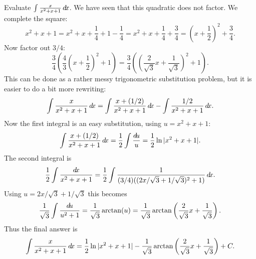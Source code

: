 \documentclass{ximera}
\begin{document}
\begin{example}
Evaluate $\int \frac{x}{x^2+x+1}\mathop{}\!d\! x$. We have seen that this
quadratic does not factor. We complete the square:
\[
  x^2+x+1=x^2+x+\frac{1}{4} + 1 -\frac{1}{4}=x^2+x+\frac{1}{4}+\frac{3}{4}=
  \left(x+\frac{1}{2}\right)^2+\frac{3}{4}.
\]
Now factor out $3/4$:
\[
  \frac{3}{4}\left(\frac{4}{3}\left(x+\frac{1}{2}\right)^2+1\right)
  =\frac{3}{4}\left(\left(\frac{2}{\sqrt{3}}x+\frac{1}{\sqrt3}\right)^2+1\right).
\]
This can be done as a rather messy trigonometric substitution problem,
but it is easier to do a bit more rewriting:
\[
  \int \frac{x}{x^2+x+1}\mathop{}\!d\! x=\int\frac{x+(1/2)}{x^2+x+1}\mathop{}\!d\! x-
  \int\frac{1/2}{x^2+x+1}\mathop{}\!d\! x.
\]
Now the first integral is an easy substitution, using $u=x^2+x+1$:
\[
  \int \frac{x+(1/2)}{x^2+x+1}\mathop{}\!d\! x=\frac{1}{2}\int \frac{\mathop{}\!d\! u}{u}=
  \frac{1}{2}\ln|x^2+x+1|.
\]
The second integral is 
\[
  \frac{1}{2}\int\frac{\mathop{}\!d\! x}{x^2+x+1}=
  \frac{1}{2}\int\frac{1}{(3/4)((2x/\sqrt3+1/\sqrt3)^2+1)}\mathop{}\!d\! x.
\]
Using $u=2x/\sqrt3+1/\sqrt3$ this becomes
\[
  \frac{1}{\sqrt3}\int\frac{\mathop{}\!d\! u}{u^2+1}=\frac{1}{\sqrt3}\arctan(u)=
  \frac{1}{\sqrt3}\arctan\left(\frac{2}{\sqrt3}x+\frac{1}{\sqrt3}\right).
\]
Thus the final answer is
\[
  \int \frac{x}{x^2+x+1}\mathop{}\!d\! x = \frac{1}{2}\ln|x^2+x+1|-
  \frac{1}{\sqrt3}\arctan\left(\frac{2}{\sqrt3}x+\frac{1}{\sqrt3}\right)+C.
\]
\end{example}
\end{document}
